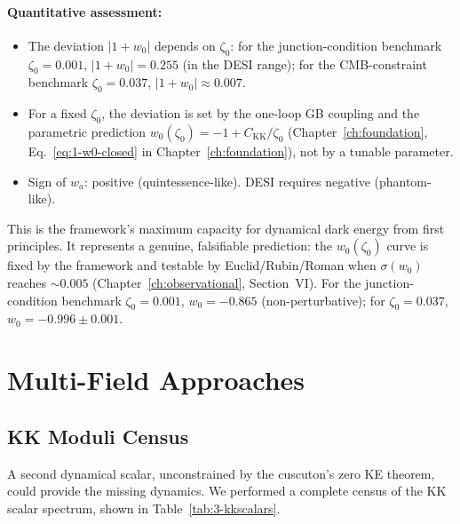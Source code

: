 \paragraph{Quantitative assessment:}
\begin{itemize}
  \item The deviation $|1 + w_0|$ depends on $\zeta_0$: for the junction-condition benchmark $\zeta_0 = 0.001$, $|1 + w_0| = 0.255$ (in the DESI range); for the CMB-constraint benchmark $\zeta_0 = 0.037$, $|1 + w_0| \approx 0.007$.
  \item For a fixed $\zeta_0$, the deviation is set by the one-loop GB coupling and the parametric prediction $w_0(\zeta_0) = -1 + C_\mathrm{KK}/\zeta_0$ (Chapter~\ref{ch:foundation}, Eq.~\eqref{eq:1-w0-closed} in Chapter~\ref{ch:foundation}), not by a tunable parameter.
  \item Sign of $w_a$: positive (quintessence-like). DESI requires negative (phantom-like).
\end{itemize}

This is the framework's maximum capacity for dynamical dark energy from first principles. It represents a genuine, falsifiable prediction: the $w_0(\zeta_0)$ curve is fixed by the framework and testable by Euclid/Rubin/Roman when $\sigma(w_0)$ reaches ${\sim}0.005$ (Chapter~\ref{ch:observational}, Section~VI). For the junction-condition benchmark $\zeta_0 = 0.001$, $w_0 = -0.865$ (non-perturbative); for $\zeta_0 = 0.037$, $w_0 = -0.996 \pm 0.001$.

\section{Multi-Field Approaches}
\label{sec:3-multifield}

\subsection{KK Moduli Census}
\label{sec:3-kkmoduli}

A second dynamical scalar, unconstrained by the cuscuton's zero KE theorem, could provide the missing dynamics. We performed a complete census of the KK scalar spectrum, shown in Table~\ref{tab:3-kkscalars}.

